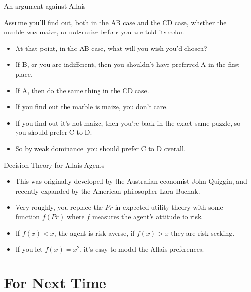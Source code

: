 \documentclass[
  ignorenonframetext,
]{beamer}
\providecommand{\tightlist}{%
  \setlength{\itemsep}{0pt}\setlength{\parskip}{0pt}}
\renewcommand{\,}{\text{, }}
\begin{document}
\begin{frame}{An argument against Allais}
\protect\hypertarget{an-argument-against-allais}{}

Assume you'll find out, both in the AB case and the CD case, whether the
marble was maize, or not-maize before you are told its color.

\begin{itemize}
\tightlist
\item
  At that point, in the AB case, what will you wish you'd chosen? \pause
\item
  If B, or you are indifferent, then you shouldn't have preferred A in
  the first place. \pause
\item
  If A, then do the same thing in the CD case.
\item
  If you find out the marble is maize, you don't care.
\item
  If you find out it's not maize, then you're back in the exact same
  puzzle, so you should prefer C to D.
\item
  So by weak dominance, you should prefer C to D overall.
\end{itemize}

\end{frame}

\begin{frame}{Decision Theory for Allais Agents}
\protect\hypertarget{decision-theory-for-allais-agents}{}

\begin{itemize}
\tightlist
\item
  This was originally developed by the Australian economist John
  Quiggin, and recently expanded by the American philosopher Lara
  Buchak.
\item
  Very roughly, you replace the \(Pr\) in expected utility theory with
  some function \(f(Pr)\) where \(f\) measures the agent's attitude to
  risk.
\item
  If \(f(x) < x\), the agent is risk averse, if \(f(x) > x\) they are
  risk seeking.
\item
  If you let \(f(x) = x^2\), it's easy to model the Allais preferences.
\end{itemize}

\end{frame}

\hypertarget{for-next-time-10}{%
\section{For Next Time}\label{for-next-time-10}}
\end{document}
